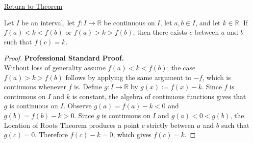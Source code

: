 \newpage
{}
\label{prf:bolzano-intermediate-value}

\begin{remark*}[Return]
\hyperref[thm:bolzano-intermediate-value]{Return to Theorem}
\end{remark*}

\begin{theorem*}
Let $I$ be an interval, let $f : I \to \mathbb{R}$ be continuous on $I$, let $a, b \in I$, and let $k \in \mathbb{R}$. If $f(a) < k < f(b)$ or $f(a) > k > f(b)$, then there exists $c$ between $a$ and $b$ such that $f(c) = k$.
\end{theorem*}

\begin{proof}
\textbf{Professional Standard Proof.}~\\
Without loss of generality assume $f(a) < k < f(b)$; the case $f(a) > k > f(b)$ follows by applying the same argument to $-f$, which is continuous whenever $f$ is. Define $g : I \to \mathbb{R}$ by $g(x) := f(x) - k$. Since $f$ is continuous on $I$ and $k$ is constant, the algebra of continuous functions gives that $g$ is continuous on $I$. Observe $g(a) = f(a) - k < 0$ and $g(b) = f(b) - k > 0$. Since $g$ is continuous on $I$ and $g(a) < 0 < g(b)$, the Location of Roots Theorem produces a point $c$ strictly between $a$ and $b$ such that $g(c) = 0$. Therefore $f(c) - k = 0$, which gives $f(c) = k$.
\end{proof}

